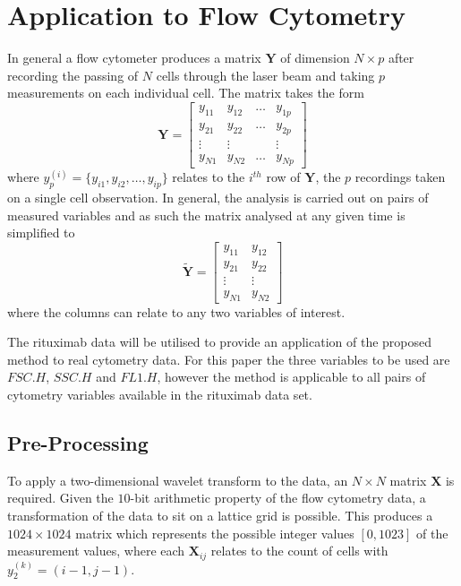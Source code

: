 \documentclass[a4paper, 12pt]{article}
\begin{document}
\section{Application to Flow Cytometry}
In general a flow cytometer produces a matrix $\mathbf{Y}$ of dimension $N \times p$ after recording the passing of $N$ cells through the laser beam and taking $p$ measurements on each individual cell. The matrix takes the form
\begin{equation*}
	\mathbf{Y} =
 		\begin{bmatrix}
  			y_{11} & y_{12} & \dots & y_{1p} \\
  			y_{21} & y_{22} & \dots & y_{2p} \\
  			\vdots  & \vdots & & \vdots \\
  			y_{N1} & y_{N2} & \dots & y_{Np}
 		\end{bmatrix}
\end{equation*}
where $y^{(i)}_{p} = \{y_{i1}, y_{i2}, \dots, y_{ip}\}$ relates to the $i^{th}$ row of $\mathbf{Y}$, the $p$ recordings taken on a single cell observation. In general, the analysis is carried out on pairs of measured variables and as such the matrix analysed at any given time is simplified to
\begin{equation*}
  \tilde{\mathbf{Y}} = 
    \begin{bmatrix}
      y_{11} & y_{12} \\
      y_{21} & y_{22} \\
      \vdots & \vdots \\
      y_{N1} & y_{N2} 
    \end{bmatrix}
\end{equation*}
where the columns can relate to any two variables of interest.

\medskip
The rituximab data \citep{rit} will be utilised to provide an application of the proposed method to real cytometry data. For this paper the three variables to be used are $FSC.H$, $SSC.H$ and $FL1.H$, however the method is applicable to all pairs of cytometry variables available in the rituximab data set.

\subsection{Pre-Processing}
To apply a two-dimensional wavelet transform to the data, an $N \times N$ matrix $\mathbf{X}$ is required. Given the $10$-bit arithmetic property of the flow cytometry data, a transformation of the data to sit on a lattice grid is possible. This produces a $1024 \times 1024$ matrix which represents the possible integer values $[ 0, 1023 ]$ of the measurement values, where each $\mathbf{X}_{ij}$ relates to the count of cells with $y^{(k)}_{2} = (i - 1, j - 1)$.
\end{document}

